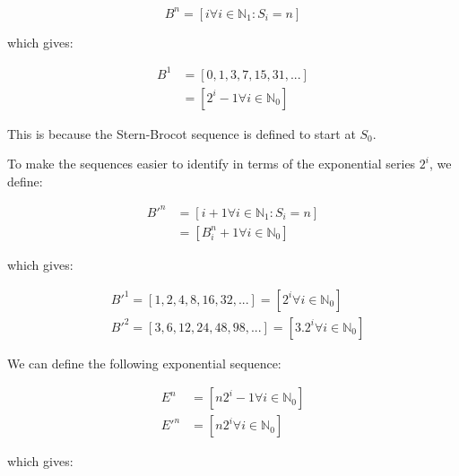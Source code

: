 \documentclass{article}
\begin{document}
\begin{displaymath}
B^n = [i \forall i \in \mathbb{N}_{1} : S_i = n]
\end{displaymath}

\noindent
which gives:

\begin{displaymath}\begin{aligned}
B^1
& = [0, 1, 3, 7, 15, 31, ...] \\
& = [2^i-1 \forall i \in \mathbb{N}_{0}]
\end{aligned}\end{displaymath}

\noindent
This is because the Stern-Brocot sequence is defined to start at
\begin{math}S_0\end{math}.

\noindent
To make the sequences easier to identify in terms of the exponential series
\begin{math}2^i\end{math}, we define:

\begin{displaymath}\begin{aligned}
B'^n
& = [i+1 \forall i \in \mathbb{N}_{1} : S_i = n] \\
& = [B^n_i + 1 \forall i \in \mathbb{N}_{0}]
\end{aligned}\end{displaymath}

\noindent
which gives:

\begin{displaymath}\begin{aligned}
& B'^1 = [1, 2,  4,  8, 16, 32, ...] =   [2^i \forall i \in \mathbb{N}_{0}] \\
& B'^2 = [3, 6, 12, 24, 48, 98, ...] = [3.2^i \forall i \in \mathbb{N}_{0}]
\end{aligned}\end{displaymath}

\noindent
We can define the following exponential sequence:

\begin{displaymath}\begin{aligned}
E^n  & = [n2^i-1 \forall i \in \mathbb{N}_{0}] \\
E'^n & = [n2^i \forall i \in \mathbb{N}_{0}]
\end{aligned}\end{displaymath}

\noindent
which gives:
\end{document}
